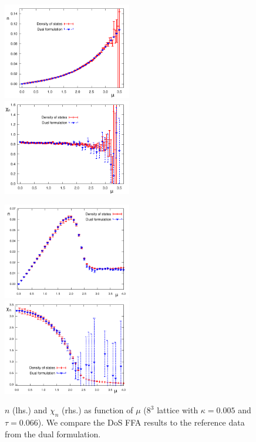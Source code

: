 \documentclass[a4paper,11pt]{article}
\begin{document}
\begin{figure}[p]
\vspace*{-8mm}
\begin{center}
\hspace*{-3mm}
{\includegraphics[width=0.5\textwidth]{N_Particle_preliminary.pdf}}  
{\includegraphics[width=0.5\textwidth]{Susce_Particle_preliminary.pdf}} 
\end{center}
\vspace*{-3mm}
\caption{$n$ (lhs.) and $\chi_n$ (rhs.) as function of $\mu$ ($8^3$ lattice with $\kappa=0.005$ and $\tau=0.066$).
We compare the DoS FFA results to the reference data from the dual formulation.}
\label{fig:results_tau0066}
%
\begin{center}
\hspace*{-3mm}
{\includegraphics[width=0.5\textwidth]{N_8to3_mu_run.pdf}}  
{\includegraphics[width=0.5\textwidth]{Susce_8to3_mu_run.pdf}} 

\end{center}
\end{figure}
\end{document}
